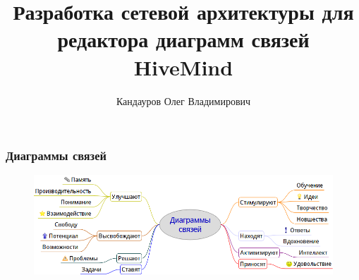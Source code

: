 \documentclass[unicode]{beamer}
\title[Разработка сетевой архитектуры в проекте HiveMind]{
Разработка сетевой архитектуры для редактора диаграмм связей HiveMind
}
\author[Кандауров О.\,В.]{Кандауров Олег Владимирович}
\institute{
Научный руководитель: ст. преподаватель Парамонов~И.\,В.
}
\date{}
\begin{document}
\maketitle
\large


\begin{frame}
\transwipe[direction=90]
\frametitle{Диаграммы связей}
\begin{figure}[h!] 
\centering
\includegraphics[width=\linewidth]{mindmap} 
\end{figure}
\end{frame}
\end{document}
